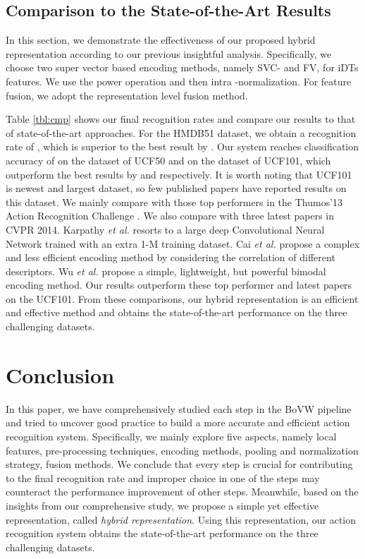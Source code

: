 \documentclass[twocolumn]{svjour3}          \smartqed  \usepackage{slashbox}
\begin{document}
\subsection{Comparison to the State-of-the-Art Results}
\label{sec:stoa}
In this section, we demonstrate the effectiveness of our proposed hybrid representation according to our previous insightful analysis. Specifically, we choose two super vector based encoding methods, namely SVC- and FV, for iDTs features. We use the power operation and then intra -normalization. For feature fusion, we adopt the representation level fusion method.

Table \ref{tbl:cmp} shows our final recognition rates and compare our results to that of state-of-the-art approaches. For the HMDB51 dataset, we obtain a recognition rate of , which is superior to the best result \cite{WangS13a} by . Our system reaches classification accuracy of  on the dataset of UCF50 and  on the dataset of UCF101, which outperform the best results by  and  respectively. It is worth noting that UCF101 is newest and largest dataset, so few published papers have reported results on this dataset. We mainly compare with those top performers in the Thumos'13 Action Recognition Challenge \cite{THUMOS13}. We also compare with three latest papers in CVPR 2014. Karpathy \emph{et al.} \cite{Karpathy14} resorts to a large deep Convolutional Neural Network trained with an extra 1-M training dataset. Cai \emph{et al.} \cite{CaiWPQ14} propose a complex and less efficient encoding method by considering the correlation of different descriptors. Wu \emph{et al.} \cite{WuZL14} propose a simple, lightweight, but powerful bimodal encoding method. Our results outperform these top performer and latest papers on the UCF101. From these comparisons, our hybrid representation is an efficient and effective method and obtains the state-of-the-art performance on the three challenging datasets.

\section{Conclusion}
\label{sec:conclusion}
In this paper, we have comprehensively studied each step in the BoVW pipeline and tried to uncover good practice to build a more accurate and efficient action recognition system. Specifically, we mainly explore five aspects, namely local features, pre-processing techniques, encoding methods, pooling and normalization strategy, fusion methods. We conclude that every step is crucial for contributing to the final recognition rate and improper choice in one of the steps may counteract the performance improvement of other steps. Meanwhile, based on the insights from our comprehensive study, we propose a simple yet effective representation, called \emph{hybrid representation}. Using this representation, our action recognition system obtains the state-of-the-art performance on the three challenging datasets.




         
\end{document}
